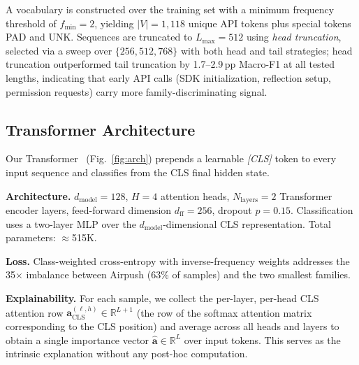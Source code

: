 \documentclass[12pt]{article}
\begin{document}
A vocabulary is constructed over the training set with a minimum
frequency threshold of $f_{\min}=2$, yielding $|V|=1{,}118$ unique
API tokens plus special tokens PAD and UNK. Sequences are truncated to
$L_{\max}=512$ using \textit{head truncation}, selected via a sweep over $\{256, 512, 768\}$ with both head
and tail strategies; head truncation outperformed tail truncation by
1.7--2.9\,pp Macro-F1 at all tested lengths, indicating that early API
calls (SDK initialization, reflection setup, permission requests) carry
more family-discriminating signal.

\subsection{Transformer Architecture}
\label{sec:arch}

Our Transformer~\citep{vaswani2017attention} (Fig.~\ref{fig:arch})
prepends a learnable \textit{[CLS]} token to every input sequence and
classifies from the CLS final hidden state.

\textbf{Architecture.}
$d_{\text{model}}=128$, $H=4$ attention heads, $N_{\text{layers}}=2$
Transformer encoder layers, feed-forward dimension $d_{\text{ff}}=256$,
dropout $p=0.15$. Classification uses a two-layer MLP over the
$d_{\text{model}}$-dimensional CLS representation. Total parameters:
$\approx$515K.

\textbf{Loss.}
Class-weighted cross-entropy with inverse-frequency weights addresses
the 35$\times$ imbalance between Airpush (63\% of samples) and the
two smallest families.

\textbf{Explainability.}
For each sample, we collect the per-layer, per-head CLS attention row
$\mathbf{a}^{(\ell,h)}_{\text{CLS}} \in \mathbb{R}^{L+1}$
(the row of the softmax attention matrix corresponding to the CLS
position) and average across all heads and layers to obtain a single
importance vector $\hat{\mathbf{a}} \in \mathbb{R}^{L}$ over input
tokens. This serves as the intrinsic explanation without any
post-hoc computation.
\end{document}
